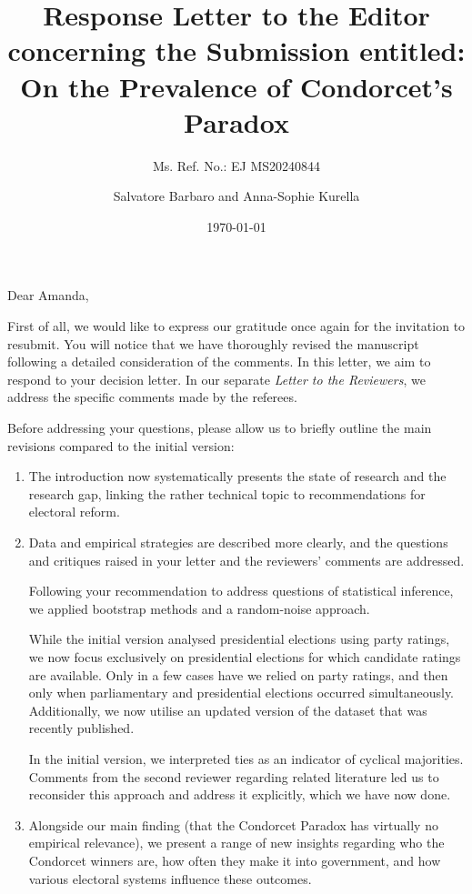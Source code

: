 \documentclass[a4paper, 12pt]{scrartcl}
\title{{\small Response Letter to the Editor concerning the Submission entitled:} \\ On the Prevalence of Condorcet's Paradox }
\subtitle{Ms. Ref. No.: EJ MS20240844}
\author{Salvatore Barbaro and Anna-Sophie Kurella}
\date{\today}
\begin{document}
\maketitle

\noindent Dear Amanda,

First of all, we would like to express our gratitude once again for the invitation to resubmit. You will notice that we have thoroughly revised the manuscript following a detailed consideration of the comments. In this letter, we aim to respond to your decision letter. In our separate \textit{Letter to the Reviewers}, we address the specific comments made by the referees.

Before addressing your questions, please allow us to briefly outline the main revisions compared to the initial version:
\begin{enumerate}
	\item The introduction now systematically presents the state of research and the research gap, linking the rather technical topic to recommendations for electoral reform.
	\item Data and empirical strategies are described more clearly, and the questions and critiques raised in your letter and the reviewers' comments are addressed.

	Following your recommendation to address questions of statistical inference, we applied bootstrap methods and a random-noise approach.
	
	While the initial version analysed presidential elections using party ratings, we now focus exclusively on presidential elections for which candidate ratings are available. Only in a few cases have we relied on party ratings, and then only when parliamentary and presidential elections occurred simultaneously. Additionally, we now utilise an updated version of the dataset that was recently published. 
	
	In the initial version, we interpreted ties as an indicator of cyclical majorities. Comments from the second reviewer regarding related literature led us to reconsider this approach and address it explicitly, which we have now done.
	\item Alongside our main finding (that the Condorcet Paradox has virtually no empirical relevance), we present a range of new insights regarding who the Condorcet winners are, how often they make it into government, and how various electoral systems influence these outcomes.
\end{enumerate}
\end{document}

